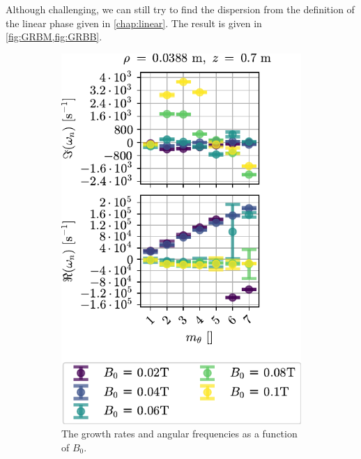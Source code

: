 Although challenging, we can still try to find the dispersion from the definition of the linear phase given in \cref{chap:linear}.
The result is given in \cref{fig:GRBM,fig:GRBB}.
%
\begin{figure}[htbp]
    \centering
    \begin{subfigure}[h]{0.45\textwidth}
        \centering
        \includegraphics{fig/results/compareBouss/growthRatesB0ModeNr}
        \caption{The growth rates and angular frequencies as a function of $B_0$.}
        \label{fig:GRBB}
    \end{subfigure}
    \hfill
    \begin{subfigure}[h]{0.45\textwidth}
        \centering

\end{subfigure}
\end{figure}
